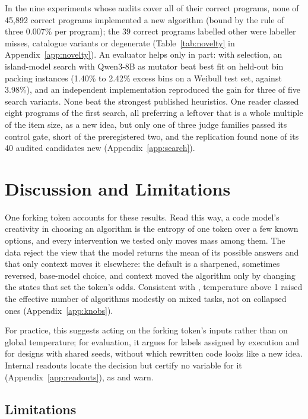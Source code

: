 \documentclass[11pt,letterpaper]{article}
\begin{document}
In the nine experiments whose audits cover all of their correct programs, none of 45,892 correct programs implemented a new algorithm (bound by the rule of three 0.007\% per program); the 39 correct programs labelled other were labeller misses, catalogue variants or degenerate (Table~\ref{tab:novelty} in Appendix~\ref{app:novelty}). An evaluator helps only in part: with selection, an island-model search with Qwen3-8B as mutator beat best fit on held-out bin packing instances (1.40\% to 2.42\% excess bins on a Weibull test set, against 3.98\%), and an independent implementation reproduced the gain for three of five search variants. None beat the strongest published heuristics. One reader classed eight programs of the first search, all preferring a leftover that is a whole multiple of the item size, as a new idea, but only one of three judge families passed its control gate, short of the preregistered two, and the replication found none of its 40 audited candidates new (Appendix~\ref{app:search}).

\section{Discussion and Limitations}
\label{sec:discussion}

One forking token accounts for these results. Read this way, a code model's creativity in choosing an algorithm is the entropy of one token over a few known options, and every intervention we tested only moves mass among them. The data reject the view that the model returns the mean of its possible answers and that only context moves it elsewhere: the default is a sharpened, sometimes reversed, base-model choice, and context moved the algorithm only by changing the states that set the token's odds. Consistent with \citet{Lee2025}, temperature above 1 raised the effective number of algorithms modestly on mixed tasks, not on collapsed ones (Appendix~\ref{app:knobs}).

For practice, this suggests acting on the forking token's inputs rather than on global temperature; for evaluation, it argues for labels assigned by execution and for designs with shared seeds, without which rewritten code looks like a new idea. Internal readouts locate the decision but certify no variable for it (Appendix~\ref{app:readouts}), as \citet{Makelov2023} and \citet{Sutter2025} warn.

\subsection{Limitations}
\label{sec:limitations}
\end{document}
